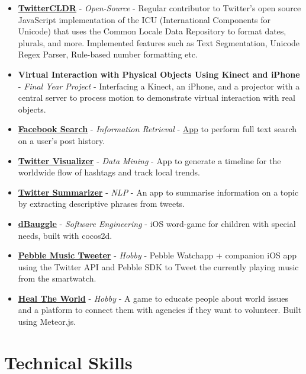 \begin{itemize}
\item
  \href{https://github.com/twitter/twitter-cldr-js}{\textbf{TwitterCLDR}}
  - \emph{Open-Source} - Regular contributor to Twitter's open source
  JavaScript implementation of the ICU (International Components for
  Unicode) that uses the Common Locale Data Repository to format dates,
  plurals, and more. Implemented features such as Text Segmentation,
  Unicode Regex Parser, Rule-based number formatting etc.
\item
  \textbf{Virtual Interaction with Physical Objects Using Kinect and
  iPhone} - \emph{Final Year Project} - Interfacing a Kinect, an iPhone,
  and a projector with a central server to process motion to demonstrate
  virtual interaction with real objects.
\item
  \href{https://github.com/radzinzki/FacebookSearch}{\textbf{Facebook
  Search}} - \emph{Information Retrieval} -
  \href{http://facebook-search.herokuapp.com/}{App} to perform full text
  search on a user's post history.
\item
  \href{https://github.com/radzinzki/Twitter-Visualiser}{\textbf{Twitter
  Visualizer}} - \emph{Data Mining} - App to generate a timeline for the
  worldwide flow of hashtags and track local trends.
\item
  \href{https://github.com/radzinzki/NLP}{\textbf{Twitter Summarizer}} -
  \emph{NLP} - An app to summarise information on a topic by extracting
  descriptive phrases from tweets.
\item
  \href{https://itunes.apple.com/us/app/dbauggle!/id625981185?mt=8}{\textbf{dBauggle}}
  - \emph{Software Engineering} - iOS word-game for children with
  special needs, built with cocos2d.
\item
  \href{https://github.com/radzinzki/Pebble-MusicTweeter}{\textbf{Pebble
  Music Tweeter}} - \emph{Hobby} - Pebble Watchapp + companion iOS app
  using the Twitter API and Pebble SDK to Tweet the currently playing
  music from the smartwatch.
\item
  \href{http://healtheworld.meteor.com/}{\textbf{Heal The World}} -
  \emph{Hobby} - A game to educate people about world issues and a
  platform to connect them with agencies if they want to volunteer.
  Built using Meteor.js.
\end{itemize}

\section{Technical Skills}\label{technical-skills}

